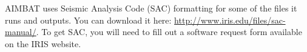 \documentclass[letterpaper,10pt]{article}
\begin{document}
AIMBAT uses Seismic Analysis Code (SAC) formatting for some of the files it runs and outputs. You can download it here: \url{http://www.iris.edu/files/sac-manual/}. To get SAC, you will need to fill out a software request form available on the IRIS website.




















\end{document}
